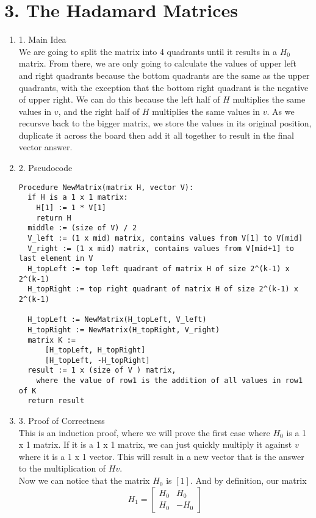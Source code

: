 \documentclass[11pt]{article}
\newenvironment{qparts}{\begin{enumerate}[{(}a{)}]}{\end{enumerate}}
\begin{document}
\newpage
\section*{3. The Hadamard Matrices}
\begin{qparts}
\item[1.] Main Idea \\
We are going to split the matrix into 4 quadrants until it results in a $H_0$ matrix. From there, we are only going to calculate the values of upper left and right quadrants because the bottom quadrants are the same as the upper quadrants, with the exception that the bottom right quadrant is the negative of upper right. We can do this because the left half of $H$ multiplies the same values in $v$, and the right half of $H$ multiplies the same values in $v$. As we recursve back to the bigger matrix, we store the values in its original position, duplicate it across the board then add it all together to result in the final vector answer.

\item[2.] Pseudocode 
\begin{verbatim}
Procedure NewMatrix(matrix H, vector V): 
  if H is a 1 x 1 matrix:
    H[1] := 1 * V[1]
    return H
  middle := (size of V) / 2
  V_left := (1 x mid) matrix, contains values from V[1] to V[mid] 
  V_right := (1 x mid) matrix, contains values from V[mid+1] to last element in V
  H_topLeft := top left quadrant of matrix H of size 2^(k-1) x 2^(k-1)
  H_topRight := top right quadrant of matrix H of size 2^(k-1) x 2^(k-1)
  
  H_topLeft := NewMatrix(H_topLeft, V_left)
  H_topRight := NewMatrix(H_topRight, V_right)
  matrix K :=
      [H_topLeft, H_topRight]
      [H_topLeft, -H_topRight]
  result := 1 x (size of V ) matrix, 
    where the value of row1 is the addition of all values in row1 of K
  return result
\end{verbatim}

\item[3.] Proof of Correctness \\
This is an induction proof, where we will prove the first case where $H_0$ is a 1 x 1 matrix. If it is a 1 x 1 matrix, we can just quickly multiply it against $v$ where it is a 1 x 1 vector. This will result in a new vector that is the answer to the multiplication of $Hv$. \\

Now we can notice that the matrix $H_0$ is $[1]$. And by definition, our matrix
\[H_1 =
\begin{bmatrix}
    H_0 & H_0 \\
    H_0 & -H_0 
\end{bmatrix}
\]


\end{qparts}
\end{document}
